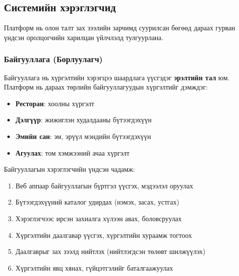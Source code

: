 \subsection{Системийн хэрэглэгчид}
\label{subsec:system_users}

Платформ нь олон талт зах зээлийн зарчимд суурилсан бөгөөд дараах гурван үндсэн оролцогчийн харилцан үйлчлэлд тулгуурлана.

\subsubsection{Байгууллага (Борлуулагч)}
Байгууллага нь хүргэлтийн хэрэгцээ шаардлага үүсгэдэг \textbf{эрэлтийн тал} юм. Платформ нь дараах төрлийн байгууллагуудын хүргэлтийг дэмждэг:
\begin{itemize}
  \item \textbf{Ресторан}: хоолны хүргэлт
  \item \textbf{Дэлгүүр}: жижиглэн худалдааны бүтээгдэхүүн
  \item \textbf{Эмийн сан}: эм, эрүүл мэндийн бүтээгдэхүүн
  \item \textbf{Агуулах}: том хэмжээний ачаа хүргэлт
\end{itemize}

Байгууллагын хэрэглэгчийн үндсэн чадамж:
\begin{enumerate}
  \item Веб аппаар байгууллагын бүртгэл үүсгэх, мэдээлэл оруулах
  \item Бүтээгдэхүүний каталог удирдах (нэмэх, засах, устгах)
  \item Хэрэглэгчээс ирсэн захиалга хүлээн авах, боловсруулах
  \item Хүргэлтийн даалгавар үүсгэх, хүргэлтийн хураамж тогтоох
  \item Даалгаврыг зах зээлд нийтлэх (нийтлэгдсэн төлөвт шилжүүлэх)
  \item Хүргэлтийн явц хянах, гүйцэтгэлийг баталгаажуулах
\end{enumerate}


